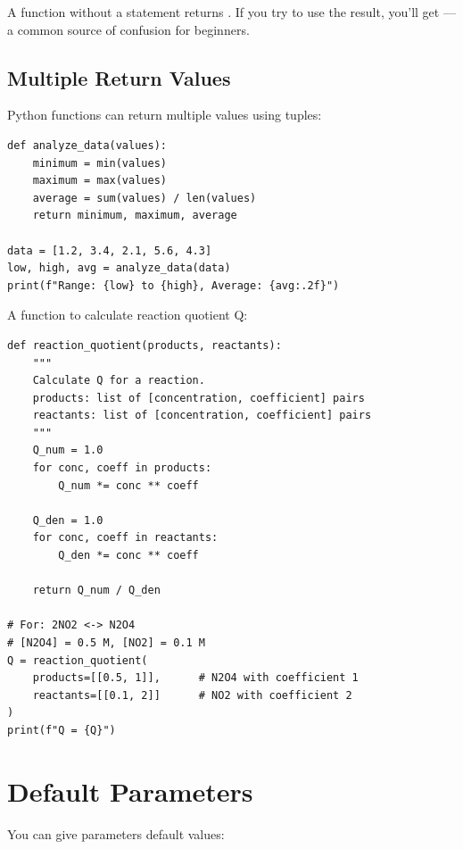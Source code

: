 \begin{note}
A function without a  statement returns . If you try to use the result, you'll get ---a common source of confusion for beginners.
\end{note}

\subsection{Multiple Return Values}

Python functions can return multiple values using tuples:

\begin{lstlisting}
def analyze_data(values):
    minimum = min(values)
    maximum = max(values)
    average = sum(values) / len(values)
    return minimum, maximum, average

data = [1.2, 3.4, 2.1, 5.6, 4.3]
low, high, avg = analyze_data(data)
print(f"Range: {low} to {high}, Average: {avg:.2f}")
\end{lstlisting}

\begin{labexample}
A function to calculate reaction quotient Q:

\begin{lstlisting}
def reaction_quotient(products, reactants):
    """
    Calculate Q for a reaction.
    products: list of [concentration, coefficient] pairs
    reactants: list of [concentration, coefficient] pairs
    """
    Q_num = 1.0
    for conc, coeff in products:
        Q_num *= conc ** coeff

    Q_den = 1.0
    for conc, coeff in reactants:
        Q_den *= conc ** coeff

    return Q_num / Q_den

# For: 2NO2 <-> N2O4
# [N2O4] = 0.5 M, [NO2] = 0.1 M
Q = reaction_quotient(
    products=[[0.5, 1]],      # N2O4 with coefficient 1
    reactants=[[0.1, 2]]      # NO2 with coefficient 2
)
print(f"Q = {Q}")
\end{lstlisting}
\end{labexample}

\section{Default Parameters}
\label{sec:default-params}

You can give parameters default values:

